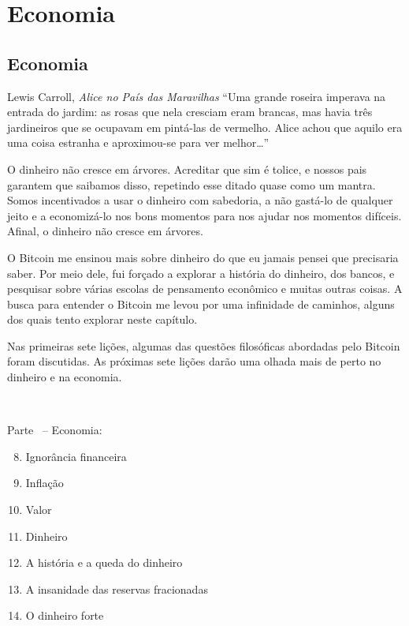 \part{Economia}
\label{ch:economics}
\chapter*{Economia}

\begin{chapquote}{Lewis Carroll, \textit{Alice no País das Maravilhas}}
\enquote{Uma grande roseira imperava na entrada do jardim: as rosas que nela cresciam eram brancas, mas havia três jardineiros que se ocupavam em pintá-las de vermelho. Alice achou que aquilo era uma coisa estranha e aproximou-se para ver melhor\ldots}
\end{chapquote}

O dinheiro não cresce em árvores. Acreditar que sim é tolice, e nossos pais garantem que saibamos disso, repetindo esse ditado quase como um mantra. Somos incentivados a usar o dinheiro com sabedoria, a não gastá-lo de qualquer jeito e a economizá-lo nos bons momentos para nos ajudar nos momentos difíceis. Afinal, o dinheiro não cresce em árvores.

O Bitcoin me ensinou mais sobre dinheiro do que eu jamais pensei que precisaria saber. Por meio dele, fui forçado a explorar a história do dinheiro, dos bancos, e pesquisar sobre várias escolas de pensamento econômico e muitas outras coisas. A busca para entender o Bitcoin me levou por uma infinidade de caminhos, alguns dos quais tento explorar neste capítulo.

Nas primeiras sete lições, algumas das questões filosóficas abordadas pelo Bitcoin foram discutidas. As próximas sete lições darão uma olhada mais de perto no dinheiro e na economia.

~

\begin{samepage}
Parte~\ref{ch:economics} -- Economia:

\begin{enumerate}
  \setcounter{enumi}{7}
  \item Ignorância financeira
  \item Inflação
  \item Valor
  \item Dinheiro
  \item A história e a queda do dinheiro
  \item A insanidade das reservas fracionadas
  \item O dinheiro forte
\end{enumerate}
\end{samepage}


